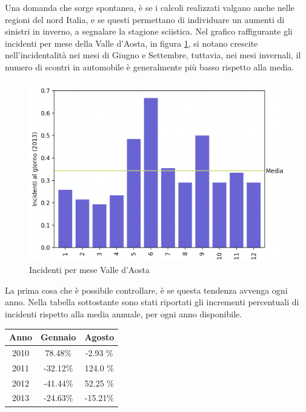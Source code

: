 \documentclass[a4paper,12pt]{report}
\begin{document}
Una domanda che sorge spontanea, è se i calcoli realizzati valgano anche nelle regioni 
del nord Italia, e se questi permettano di individuare un aumenti di sinistri in 
inverno, a segnalare la stagione sciistica.
Nel grafico raffigurante gli incidenti per mese della Valle d'Aosta, 
in figura \ref{fig:aosta}, si notano crescite nell'incidentalità 
nei mesi di Giugno e Settembre, tuttavia, nei mesi invernali, il numero di scontri in 
automobile è generalmente più basso rispetto alla media.

\begin{figure}
    \includegraphics[width=\linewidth]{../src/incidenti/incidenti_senza_coords/mese_incidenti/aosta_mese.png}
    \caption{Incidenti per mese Valle d'Aosta}
    \label{fig:aosta}
\end{figure}

La prima cosa che è possibile controllare, è se questa tendenza avvenga ogni anno. 
Nella tabella sottostante sono stati riportati gli incrementi percentuali di incidenti 
rispetto alla media annuale, per ogni anno disponibile.

\begin{center}
    \def\arraystretch{1.5}%
    \begin{tabular}{ |c|c|c| } 
    \hline
    Anno & Gennaio & Agosto \\ 
    \hline
    \rowcolor{TableGray}
    2010 & 78.48\%  & -2.93 \%\\ 
    2011 & -32.12\% & 124.0 \%\\
    \rowcolor{TableGray}
    2012 & -41.44\% & 52.25 \% \\
    2013 & -24.63\% & -15.21\% \\
    \hline
    \end{tabular}
\end{center}
\end{document}
